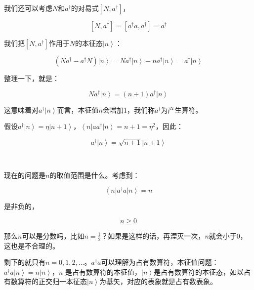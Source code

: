 我们还可以考虑$N$和$a^\dagger$的对易式$\left[ N, a^\dagger \right]$，

\begin{equation*}
\left[ N, a^\dagger \right] = \left[ a^\dagger a , a^\dagger \right] = a^\dagger
\end{equation*}

我们把$\left[ N, a^\dagger \right] $作用于$N$的本征态$\left| n \right\rangle$：

\begin{equation*}
\left( N a^\dagger - a^\dagger N \right) \left| n \right\rangle =   N a^\dagger \left| n \right\rangle - n a^\dagger \left| n \right\rangle = a^\dagger \left| n \right\rangle 
\end{equation*}

整理一下，就是：

\begin{equation}
N a^\dagger \left| n \right\rangle = (n +1) a^\dagger \left| n \right\rangle
\end{equation}

这意味着对$a^\dagger \left| n \right\rangle$而言，本征值$n$会增加1，我们称$a^\dagger$为产生算符。

假设$a^\dagger \left| n \right\rangle = \eta \left| n+1 \right\rangle$，$\left\langle n \right| a a^\dagger \left| n \right\rangle = n + 1 = \eta^2 $，因此：

\begin{equation}
a^\dagger \left| n \right\rangle = \sqrt{n + 1} \left| n+1 \right\rangle 
\end{equation}

~

现在的问题是$n$的取值范围是什么。考虑到：

\begin{equation}
\left\langle n \right| a^\dagger a \left| n \right\rangle = n
\end{equation}

是非负的，

\begin{equation}
n \ge 0
\end{equation}

那么$n$可以是分数吗，比如$n = \frac{1}{2}$？如果是这样的话，再湮灭一次，$n$就会小于0，这也是不合理的。

剩下的就只有$n = 0, 1, 2, ...$。$a^\dagger a$可以理解为占有数算符，本征值问题：$a^\dagger  a\left| n \right\rangle  = n\left| n \right\rangle $，$n$ 是占有数算符的本征值，$\left| n \right\rangle $是占有数算符的本征态，如以占有数算符的正交归一本征态$\left| n \right\rangle $为基矢，对应的表象就是占有数表象。

